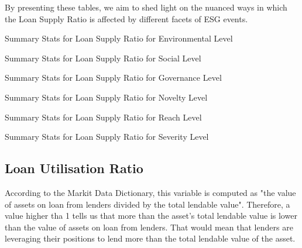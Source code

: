 By presenting these tables, we aim to shed light on the nuanced ways in which the Loan Supply Ratio is affected by different facets of ESG events.

\begin{table}[H]
\caption{Summary Stats for Loan Supply Ratio for Environmental Level}
\centering

\label{table:loan_supply_ratio_environment.tex}
\end{table}

\begin{table}[H]
\caption{Summary Stats for Loan Supply Ratio for Social Level}
\centering

\label{table:loan_supply_ratio_social.tex}
\end{table}

\begin{table}[H]
\caption{Summary Stats for Loan Supply Ratio for Governance Level}
\centering

\label{table:loan_supply_ratio_governance.tex}
\end{table}


\begin{table}[H]
\caption{Summary Stats for Loan Supply Ratio for Novelty Level}
\centering

\label{table:loan_supply_ratio_novelty.tex}
\end{table}

\begin{table}[H]
\caption{Summary Stats for Loan Supply Ratio for Reach Level}
\centering

\label{table:loan_supply_ratio_reach.tex}
\end{table}

\begin{table}[H]
\caption{Summary Stats for Loan Supply Ratio for Severity Level}
\centering

\label{table:loan_supply_ratio_severity.tex}
\end{table}



\subsection{Loan Utilisation Ratio}

According to the Markit Data Dictionary, this variable is computed as "the value of assets on loan from lenders divided by the total lendable value". Therefore, a value higher tha 1 tells us that more than the asset's total lendable value is lower than the value of assets on loan from lenders. That would mean that lenders are leveraging their positions to lend more than the total lendable value of the asset.


